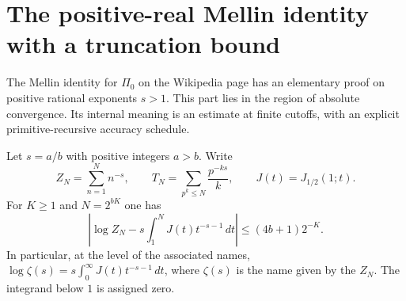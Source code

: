 \section{The positive-real Mellin identity with a truncation bound}
\label{sec:mellin}
The Mellin identity for $\Pi_0$ on the Wikipedia page has an elementary proof on positive rational exponents $s>1$. This part lies in the region of absolute convergence. Its internal meaning is an estimate at finite cutoffs, with an explicit primitive-recursive accuracy schedule.

\begin{theorem}
Let $s=a/b$ with positive integers $a>b$. Write
\[
 Z_N=\sum_{n=1}^N n^{-s},\qquad
 T_N=\sum_{p^k\le N}\frac{p^{-ks}}{k},\qquad
 J(t)=J_{1/2}(1;t).
\]
For $K\ge1$ and $N=2^{bK}$ one has
\[
 \left|\log Z_N-s\int_1^N J(t)t^{-s-1}\,dt\right|
     \le (4b+1)2^{-K}.
\]
In particular, at the level of the associated names,
$\log\zeta(s)=s\int_0^\infty J(t)t^{-s-1}\,dt$, where $\zeta(s)$ is the name given by the $Z_N$. The integrand below $1$ is assigned zero.
\end{theorem}
